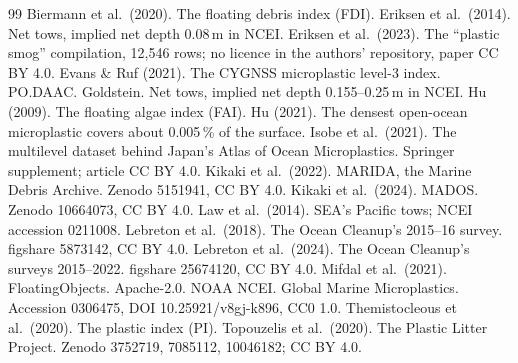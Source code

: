 \documentclass[10pt]{article}
\begin{document}
\begin{thebibliography}{99}\small
{} Biermann et al.\ (2020). The floating debris index (FDI).
 Eriksen et al.\ (2014). Net tows, implied net depth 0.08\,m in NCEI.
 Eriksen et al.\ (2023). The ``plastic smog'' compilation, 12,546 rows; no licence in the authors'
repository, paper CC BY 4.0.
 Evans \& Ruf (2021). The CYGNSS microplastic level-3 index. PO.DAAC.
 Goldstein. Net tows, implied net depth 0.155--0.25\,m in NCEI.
 Hu (2009). The floating algae index (FAI).
 Hu (2021). The densest open-ocean microplastic covers about 0.005\,\% of the surface.
 Isobe et al.\ (2021). The multilevel dataset behind Japan's Atlas of Ocean Microplastics. Springer
supplement; article CC BY 4.0.
 Kikaki et al.\ (2022). MARIDA, the Marine Debris Archive. Zenodo 5151941, CC BY 4.0.
 Kikaki et al.\ (2024). MADOS. Zenodo 10664073, CC BY 4.0.
 Law et al.\ (2014). SEA's Pacific tows; NCEI accession 0211008.
 Lebreton et al.\ (2018). The Ocean Cleanup's 2015--16 survey. figshare 5873142, CC BY 4.0.
 Lebreton et al.\ (2024). The Ocean Cleanup's surveys 2015--2022. figshare 25674120, CC BY 4.0.
 Mifdal et al.\ (2021). FloatingObjects. Apache-2.0.
 NOAA NCEI. Global Marine Microplastics. Accession 0306475, DOI 10.25921/v8gj-k896, CC0 1.0.
 Themistocleous et al.\ (2020). The plastic index (PI).
 Topouzelis et al.\ (2020). The Plastic Litter Project. Zenodo 3752719, 7085112, 10046182; CC BY 4.0.
\end{thebibliography}
\end{document}
